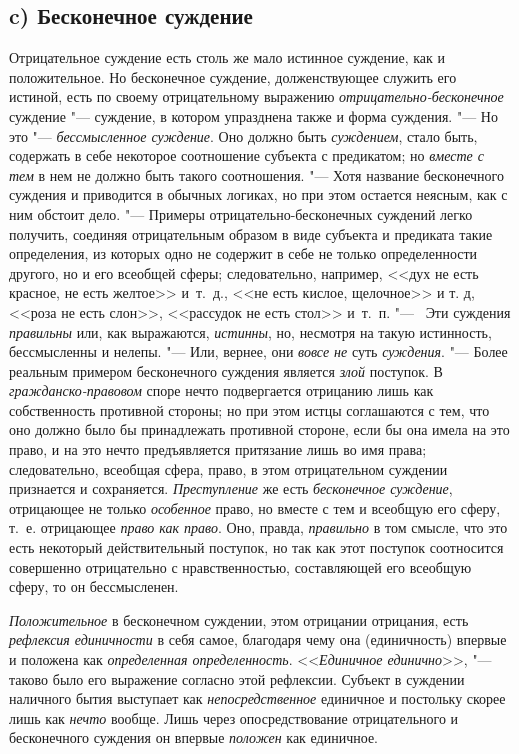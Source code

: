 {\subsection[c) Бесконечное суждение]{c) Бесконечное суждение}
Отрицательное суждение есть столь же мало истинное суждение,
как и положительное. Но бесконечное суждение, долженствующее служить его
истиной, есть по своему отрицательному выражению
{\em отрицательно-бесконечное}
суждение "--- суждение, в котором упразднена
также и форма суждения. "--- Но это
"--- {\em бессмысленное суждение}.
Оно должно быть
{\em суждением}, стало
быть, содержать в себе некоторое соотношение субъекта с предикатом; но
{\em вместе с тем} в нем
не должно быть такого соотношения. "--- Хотя название
бесконечного суждения и приводится в обычных логиках, но при этом остается
неясным, как с ним обстоит дело. "--- Примеры
отрицательно-бесконечных суждений легко получить, соединяя отрицательным
образом в виде субъекта и предиката такие определения, из которых одно не
содержит в себе не только определенности другого, но и его всеобщей сферы;
следовательно, например, <<дух не есть красное, не есть желтое>> и~т.~д., <<не
есть кислое, щелочное>> и т. д, <<роза не есть слон>>, <<рассудок не есть стол>>
и~т.~п. "--- \ Эти суждения
{\em правильны} или, как
выражаются, {\em истинны},
но, несмотря на такую истинность, бессмысленны и нелепы. "---
Или, вернее, они
{\em вовсе не} суть
{\em суждения}. "--- Более
реальным примером бесконечного суждения является
{\em злой} поступок. В
{\em гражданско-правовом}
споре нечто подвергается отрицанию лишь как собственность
противной стороны; но при этом истцы соглашаются с тем, что оно должно было
бы принадлежать противной стороне, если бы она имела на это право, и на это
нечто предъявляется притязание лишь во имя права; следовательно, всеобщая
сфера, право, в этом отрицательном суждении признается и сохраняется.
{\em Преступление} же
есть {\em бесконечное суждение},
отрицающее не только
{\em особенное} право, но
вместе с тем и всеобщую его сферу, т.~е. отрицающее
{\em право как право}.
Оно, правда,
{\em правильно} в том
смысле, что это есть некоторый действительный поступок, но так как этот
поступок соотносится совершенно отрицательно с нравственностью,
составляющей его всеобщую сферу, то он бессмысленен.

{\em Положительное} в
бесконечном суждении, этом отрицании отрицания, есть
{\em рефлексия единичности}
в себя самое, благодаря чему она (единичность) впервые и
положена как {\em определенная
определенность}. <<{\em Единичное
единично}>>, "--- таково было его выражение согласно этой
рефлексии. Субъект в суждении наличного бытия выступает как
{\em непосредственное}
единичное и постольку скорее лишь как
{\em нечто} вообще. Лишь
через опосредствование отрицательного и бесконечного суждения он впервые
{\em положен} как
единичное.

}

